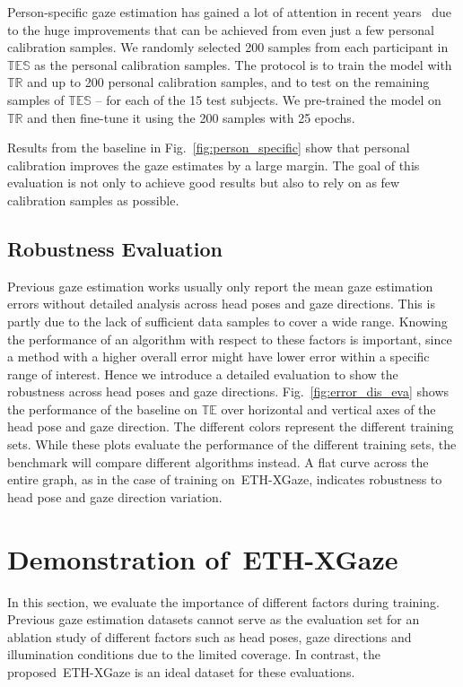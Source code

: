 \documentclass[runningheads]{llncs}
\newcommand{\datasetname}{ETH-XGaze\xspace}
\begin{document}
Person-specific gaze estimation has gained a lot of attention in recent years~\cite{Park2019ICCV,yu2019improving,liu2018differential} due to the huge improvements that can be achieved from even just a few personal calibration samples.
We randomly selected 200 samples from each participant in $\mathbb{TES}$ as the personal calibration samples.
The protocol is to train the model with $\mathbb{TR}$ and up to 200 personal calibration samples, and to test on the remaining samples of $\mathbb{TES}$ -- for each of the 15 test subjects. We pre-trained the model on $\mathbb{TR}$ and then fine-tune it using the 200 samples with 25 epochs.

Results from the baseline in Fig.~\ref{fig:person_specific} show that personal calibration improves the gaze estimates by a large margin.
The goal of this evaluation is not only to achieve good results but also to rely on as few calibration samples as possible.

\subsection{Robustness Evaluation}
Previous gaze estimation works usually only report the mean gaze estimation errors without detailed analysis across head poses and gaze directions. This is partly due to the lack of sufficient data samples to cover a wide range. Knowing the performance of an algorithm with respect to these factors is important, since a method with a higher overall error might have lower error within a specific range of interest. Hence we introduce a detailed evaluation to show the robustness across head poses and gaze directions. Fig.~\ref{fig:error_dis_eva} shows the performance of the baseline on $\mathbb{TE}$ over horizontal and vertical axes of the head pose and gaze direction. The different colors represent the different training sets. While these plots evaluate the performance of the different training sets, the benchmark will compare different algorithms instead.
A flat curve across the entire graph, as in the case of training on~\datasetname, indicates robustness to head pose and gaze direction variation.

\section{Demonstration of~\datasetname}

In this section, we evaluate the importance of different factors during training.
Previous gaze estimation datasets cannot serve as the evaluation set for an ablation study of different factors such as head poses, gaze directions and illumination conditions due to the limited coverage.
In contrast, the proposed~\datasetname is an ideal dataset for these evaluations.
\end{document}
